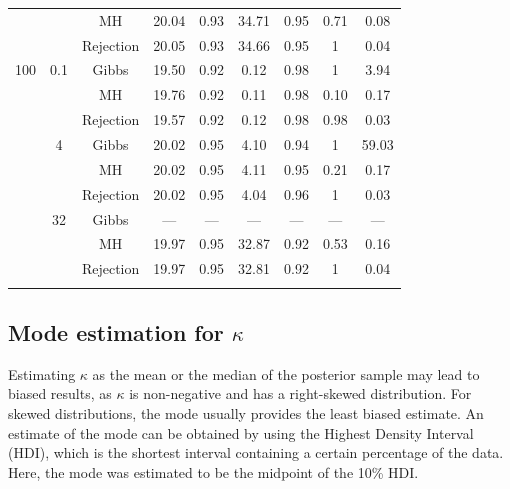 \documentclass[]{gSCS2e}
\theoremstyle{plain}
\theoremstyle{definition}
\theoremstyle{remark}
\begin{document}
\begin{table}
\begin{minipage}{0.90\textwidth}
\begin{center}
{\begin{tabular}{ccccccccc}
   &  & MH & 20.04 & 0.93 & 34.71 & 0.95 & 0.71 & 0.08 \\ 
   &  & Rejection & 20.05 & 0.93 & 34.66 & 0.95 & 1 & 0.04 \\ 
   \cmidrule{1-9}100 & 0.1 & Gibbs & 19.50 & 0.92 & 0.12 & 0.98 & 1 & 3.94 \\ 
   &  & MH & 19.76 & 0.92 & 0.11 & 0.98 & 0.10 & 0.17 \\ 
   \vspace{0.2cm} &  & Rejection & 19.57 & 0.92 & 0.12 & 0.98 & 0.98 & 0.03 \\ 
   & 4 & Gibbs & 20.02 & 0.95 & 4.10 & 0.94 & 1 & 59.03 \\ 
   &  & MH & 20.02 & 0.95 & 4.11 & 0.95 & 0.21 & 0.17 \\ 
   \vspace{0.2cm} &  & Rejection & 20.02 & 0.95 & 4.04 & 0.96 & 1 & 0.03 \\ 
   & 32 & Gibbs & --- & --- & --- & --- & --- & --- \\ 
   &  & MH & 19.97 & 0.95 & 32.87 & 0.92 & 0.53 & 0.16 \\ 
   &  & Rejection & 19.97 & 0.95 & 32.81 & 0.92 & 1 & 0.04 \\ 
   \botrule 
\end{tabular}
}
\end{center}

\end{minipage}
\end{table}




\subsection{Mode estimation for $\kappa$ \label{hdimode}}

Estimating $\kappa$ as the mean or the median of the posterior sample may lead to biased results, as $\kappa$ is non-negative and has a right-skewed distribution. For skewed distributions, the mode usually provides the least biased estimate. An estimate of the mode can be obtained by using the Highest Density Interval (HDI), which is the shortest interval containing a certain percentage of the data.\cite{venter1967estimation} Here, the mode was estimated to be the midpoint of the 10\% HDI. 
\end{document}
